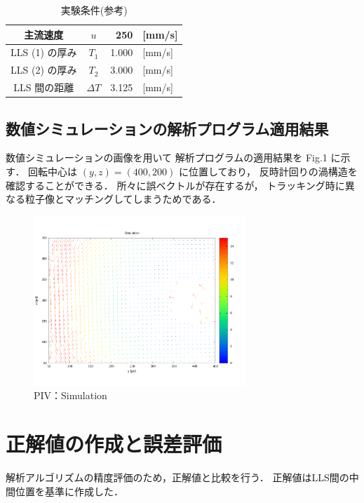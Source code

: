 \documentclass[twocolumn,a4j]{jsarticle}
\begin{document}
\begin{table}[hbtp]
  \label{table:data_type}
  \caption{実験条件(参考)}
  \centering
  \begin{tabular}{ c c | r l}
    \hline
    主流速度       & $u$        & 250   & [mm/s] \\ \hline
    LLS (1) の厚み & $T_1$      & 1.000 & [mm/s] \\ \hline
    LLS (2) の厚み & $T_2$      & 3.000 & [mm/s] \\ \hline
    LLS 間の距離   & $\Delta T$ & 3.125 & [mm/s] \\ \hline
  \end{tabular}
\end{table}

\newpage
\subsection{数値シミュレーションの解析プログラム適用結果}
数値シミュレーションの画像を用いて
解析プログラムの適用結果を Fig.1 に示す．
回転中心は $(y,z) = (400, 200)$ に位置しており，
反時計回りの渦構造を確認することができる．
所々に誤ベクトルが存在するが，
トラッキング時に異なる粒子像とマッチングしてしまうためである．

\begin{figure}[htbp]
  \footnotesize
  \begin{center}
    \includegraphics[width=80mm]{../images/average.png}
    \caption{PIV：Simulation}
  \end{center}
\end{figure}

\section{正解値の作成と誤差評価}
解析アルゴリズムの精度評価のため，正解値と比較を行う．
正解値はLLS間の中間位置を基準に作成した．
\end{document}
